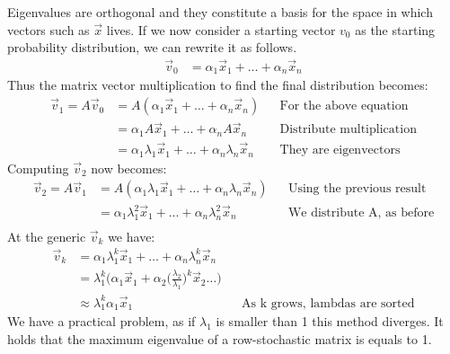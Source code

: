 Eigenvalues are orthogonal and they constitute a basis for the space 
in which vectors such as $\vec{x}$ lives.
If we now consider a starting vector $v_0$ as the starting probability distribution, we can rewrite it as follows.
\begin{equation}
    \begin{aligned}
        \vec{v}_0 &= \alpha_1\vec{x}_1 + \dots + \alpha_n\vec{x}_n
    \end{aligned}
\end{equation}
Thus the matrix vector multiplication to find the final distribution becomes:
\begin{equation}
    \begin{aligned}
         \vec{v}_1 = A\vec{v}_0 &= A(\alpha_1\vec{x}_1 + \dots + \alpha_n\vec{x}_n) && \text{For the above equation}\\
         &= \alpha_1A\vec{x}_1 + \dots + \alpha_nA\vec{x}_n && \text{Distribute multiplication}\\
         &= \alpha_1\lambda_1\vec{x}_1 + \dots + \alpha_n\lambda_n\vec{x}_n && \text{They are eigenvectors}
    \end{aligned}
\end{equation}
Computing $\vec{v}_2$ now becomes:
\begin{equation}
    \begin{aligned}
         \vec{v}_2 = A\vec{v}_1 &= A(\alpha_1\lambda_1\vec{x}_1 + \dots + \alpha_n\lambda_n\vec{x}_n) && \text{Using the previous result}\\
         &= \alpha_1\lambda_1^2\vec{x}_1 + \dots + \alpha_n\lambda_n^2\vec{x}_n && \text{We distribute A, as before}\\
    \end{aligned}
\end{equation}
At the generic $\vec{v}_k$ we have:
\begin{equation}
    \begin{aligned}
         \vec{v}_k &= \alpha_1\lambda_1^k\vec{x}_1 + \dots + \alpha_n\lambda_n^k\vec{x}_n\\
         &= \lambda_1^k\bigg(\alpha_1\vec{x}_1 + 
         \alpha_2\bigg(\frac{\lambda_2}{\lambda_1}\bigg)^k\vec{x}_2 \dots\bigg)\\
         &\approx \lambda_1^k\alpha_1\vec{x}_1 &&\text{As k grows, lambdas are sorted}
    \end{aligned}
\end{equation}
We have a practical problem, as if $\lambda_1$ is smaller than 1 this method 
diverges. 
It holds that the maximum eigenvalue of a row-stochastic matrix
is equals to 1.
